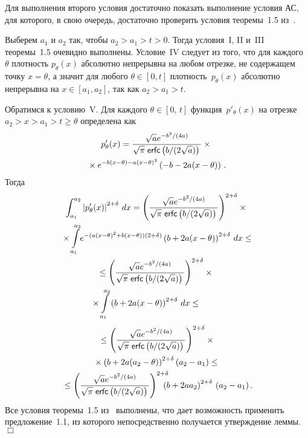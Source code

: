 \begin{multicols}{2}
\smallskip

Для выполнения второго условия достаточно показать выполнение условия АС, для которого, 
в свою очередь, достаточно проверить условия теоремы~1.5 из~\cite{chibisov}.

\smallskip

Выберем $a_1$ и $a_2$ так, чтобы $a_2 > a_1 > t > 0$. 
Тогда условия~I, II и~III теоремы~1.5 очевидно выполнены. Условие~IV следует из того, что для 
каж\-дого~$\theta$ плотность $p_{\theta}(x)$ абсолютно непрерывна на любом отрезке, не содержащем 
точку $x = \theta$, а значит для любого $\theta \in [0, t]$ плотность~$p_{\theta}(x)$ абсолютно непрерывна 
на $x \in [a_1, a_2]$, так как $a_2 > a_1 > t$.

\smallskip

Обратимся к условию~V. Для каждого $\theta \in [0,\,t]$ функция~$p'_{\theta}(x)$ на отрезке 
$a_2 > x > a_1 > t \geq \theta$ определена как
\begin{multline*}
p'_{\theta}(x) = \displaystyle\frac{\displaystyle \sqrt{a} e^{-{b^2}/(4a)}\mathstrut}{\displaystyle \sqrt{\pi}\;{\sf erfc}\left(b/(2\sqrt{a})\right)\mathstrut}\times{}\\
{}\times e^{-b(x - \theta) - a(x - 
\theta)^2}\left(-b - 2a(x - \theta)\right)\,.
\end{multline*}
Тогда
\begin{multline*}
\int_{a_1}^{a_2} \left|p'_{\theta}(x)\right|^{2 + \delta}\,dx =
 \left(\fr{\sqrt{a} e^{-{b^2}/(4a)}}{\sqrt{\pi}\;{\sf erfc}\left(b/(2\sqrt{a})\right)}\right)^{2+\delta}\times{}\\
\!{}\times
\int\limits_{a_1}^{a_2}\! e^{-(a(x-\theta)^2+b(x-\theta))(2+\delta)} 
\left(b+2a(x-\theta)\right)^{2+\delta}\, dx \leq\hspace*{-0.78734pt}\\
\leq \left(\fr{\sqrt{a} e^{-{b^2}/(4a)}}{\sqrt{\pi}\;{\sf erfc}\left(b/(2\sqrt{a})\right)}\right)^{2+\delta} \times{}\\
{}\times
\int\limits_{a_1}^{a_2} \left(b + 2a(x - \theta)\right)^{2 + \delta}\, dx \leq\hspace*{10mm}
 \end{multline*}
 \begin{multline*}
{}
\leq \left(\displaystyle\frac{\displaystyle \sqrt{a} e^{-{b^2}/(4a)}\mathstrut}{\displaystyle \sqrt{\pi}\;{\sf erfc}\left(b/(2\sqrt{a})\right)\mathstrut}\right)^{2+\delta}\times{}\\
{}\times\left(b + 2a(a_2 - \theta)\right)^{2 + 
\delta}\left(a_2 - a_1\right) \leq{}\\
{}
\leq \left(\displaystyle\frac{\displaystyle \sqrt{a} e^{-{b^2}/(4a)}\mathstrut}{\displaystyle \sqrt{\pi}\;{\sf erfc}\left(b/(2\sqrt{a})\right)\mathstrut}\right)^{2+\delta}\,
\!\!\!\!\!\!\left(b + 2aa_2\right)^{2 + \delta}\,(a_2 - a_1)\,.\hspace*{-1.38pt}
\end{multline*}
Все условия теоремы~1.5 из~\cite{chibisov} выполнены, что дает возможность применить предложение~1.1, 
из которого непосредственно получается утверждение леммы. \hfill $\Box$



\end{multicols}

